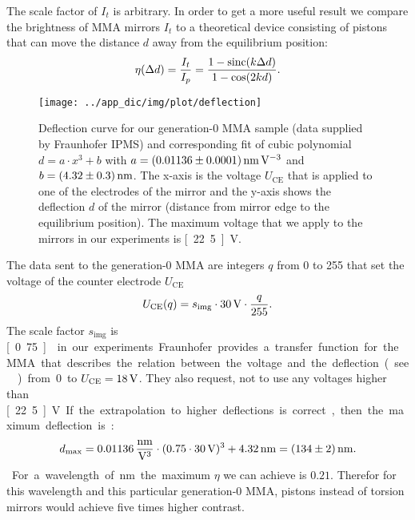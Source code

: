 The scale factor of $I_t$ is arbitrary. In order to get a more useful
result we compare the brightness of MMA mirrors $I_t$ to a theoretical
device consisting of pistons that can move the distance $d$ away from
the equilibrium position:
\begin{align}
\label{eqn:eta}
  \eta(\Delta d)=\frac{I_t}{I_p}=\frac{1-\operatorname*{sinc}(k\Delta d)}{1-\cos(2kd)}.
\end{align}
\begin{figure}[ht]
  \centering
  \texttt{[image: ../app\_dic/img/plot/deflection]}
  \caption{Deflection curve for our generation-0 MMA sample (data
    supplied by Fraunhofer IPMS) and corresponding fit of cubic
    polynomial $d=a\cdot x^3+b$ with $a=\unit[(0.01136\pm0.0001)]{nm\,
      V^{-3}}$ and $b=\unit[(4.32\pm0.3)]{nm}$. The x-axis is the
    voltage $U_\textrm{CE}$ that is applied to one of the electrodes
    of the mirror and the y-axis shows the deflection $d$ of the
    mirror (distance from mirror edge to the equilibrium
    position). The maximum voltage that we apply to the mirrors in our
    experiments is \unit[22.5]{V}.}
  \label{fig:deflection}
\end{figure}
The data sent to the generation-0 MMA are integers $q$ from 0 to 255
that set the voltage of the counter electrode $U_\textrm{CE}$
\begin{align}
U_\textrm{CE}(q)=s_\textrm{img}\cdot \unit[30]{V} \cdot \frac{q}{255}.
\end{align}
The scale factor $s_\textrm{img}$ is \unit[0.75]{} in our experiments.
Fraunhofer provides a transfer function for the MMA that describes the
relation between the voltage and the deflection (see
) from 0 to $U_\textrm{CE}=\unit[18]{V}$. They
also request, not to use any voltages higher than \unit[22.5]{V}. If
the extrapolation to higher deflections is correct, then the maximum
deflection is: %
\begin{align}
\label{eqn:dmax}
d_\textrm{max}=\unit[0.01136]{\frac{nm}{V^3}}\cdot(0.75\cdot\unit[30]{V})^3+\unit[4.32]{nm}
=\unit[(134\pm2)]{nm}.
\end{align}
For a wavelength of \unit[480]{nm} the maximum $\eta$ we can achieve
is $0.21$. Therefor for this wavelength and this particular
generation-0 MMA, pistons instead of torsion mirrors would achieve
five times higher contrast.

